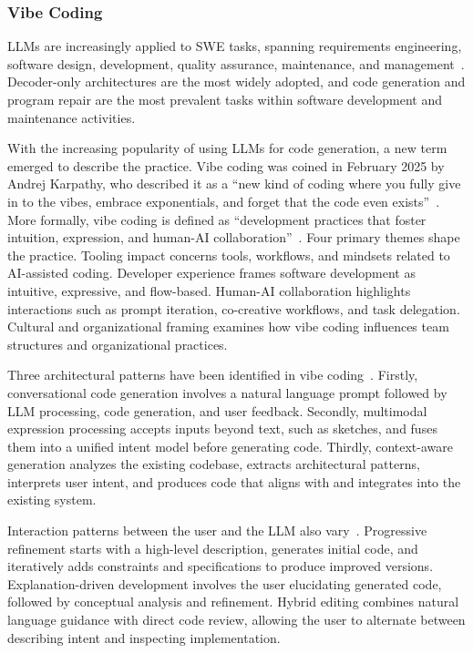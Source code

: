 \documentclass[
english,                 %
bibtex,                  %
includeExtraAbstracts, %
]{kththesis}
\numberwithin{listing}{chapter}
\begin{document}
\subsubsection{Vibe Coding}

\Glspl{LLM} are increasingly applied to \gls{SWE} tasks, spanning requirements engineering, software design, development, quality assurance, maintenance, and management~\cite{hou_large_2024}. Decoder-only architectures are the most widely adopted, and code generation and program repair are the most prevalent tasks within software development and maintenance activities.

With the increasing popularity of using \glspl{LLM} for code generation, a new term emerged to describe the practice. Vibe coding was coined in February 2025 by Andrej Karpathy, who described it as a ``new kind of coding where you fully give in to the vibes, embrace exponentials, and forget that the code even exists''~\cite{andrej_karpathy_karpathy_theres_2025}. More formally, vibe coding is defined as ``development practices that foster intuition, expression, and human-AI collaboration''~\cite{beaulieu_vibe_2025}. Four primary themes shape the practice. Tooling impact concerns tools, workflows, and mindsets related to AI-assisted coding. Developer experience frames software development as intuitive, expressive, and flow-based. Human-AI collaboration highlights interactions such as prompt iteration, co-creative workflows, and task delegation. Cultural and organizational framing examines how vibe coding influences team structures and organizational practices.

Three architectural patterns have been identified in vibe coding~\cite{akhilesh_gadde_democratizing_2025}. Firstly, conversational code generation involves a natural language prompt followed by \gls{LLM} processing, code generation, and user feedback. Secondly, multimodal expression processing accepts inputs beyond text, such as sketches, and fuses them into a unified intent model before generating code. Thirdly, context-aware generation analyzes the existing codebase, extracts architectural patterns, interprets user intent, and produces code that aligns with and integrates into the existing system.

Interaction patterns between the user and the \gls{LLM} also vary~\cite{akhilesh_gadde_democratizing_2025}. Progressive refinement starts with a high-level description, generates initial code, and iteratively adds constraints and specifications to produce improved versions. Explanation-driven development involves the user elucidating generated code, followed by conceptual analysis and refinement. Hybrid editing combines natural language guidance with direct code review, allowing the user to alternate between describing intent and inspecting implementation.
\end{document}
